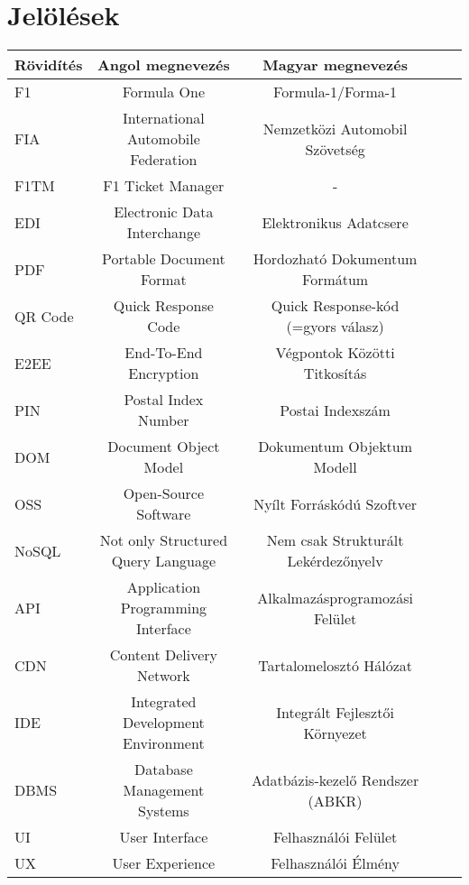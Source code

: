 \chapter*{Jelölések}

\begin{table}[h!]
	\centering
	\begin{tabular}{ | l | c | c | c | c |}
		\hline 
		\textbf{Rövidítés} & \textbf{Angol megnevezés} & \textbf{Magyar megnevezés}\\
		\hline
		F1 & Formula One & Formula-1/Forma-1\\
		\hline
		FIA & International Automobile Federation & Nemzetközi Automobil Szövetség \\
		\hline
		F1TM & F1 Ticket Manager & - \\
		\hline
		EDI & Electronic Data Interchange & Elektronikus Adatcsere \\
		\hline
		PDF & Portable Document Format & Hordozható Dokumentum Formátum \\
		\hline
		QR Code & Quick Response Code & Quick Response-kód (=gyors válasz) \\
		\hline
		E2EE & End-To-End Encryption & Végpontok Közötti Titkosítás \\
		\hline
		PIN & Postal Index Number & Postai Indexszám \\
		\hline
		DOM & Document Object Model & Dokumentum Objektum Modell \\
		\hline
		OSS & Open-Source Software & Nyílt Forráskódú Szoftver \\
		\hline
		NoSQL & Not only Structured Query Language & Nem csak Strukturált
		 Lekérdezőnyelv \\
		\hline
		API & Application Programming Interface & Alkalmazásprogramozási Felület \\
		\hline
		CDN & Content Delivery Network & Tartalomelosztó Hálózat \\
		\hline
		IDE & Integrated Development Environment & Integrált Fejlesztői Környezet \\
		\hline
		DBMS & Database Management Systems & Adatbázis-kezelő Rendszer (ABKR) \\
		\hline
		UI & User Interface & Felhasználói Felület \\
		\hline
		UX & User Experience & Felhasználói Élmény \\

\end{tabular}
\end{table}
